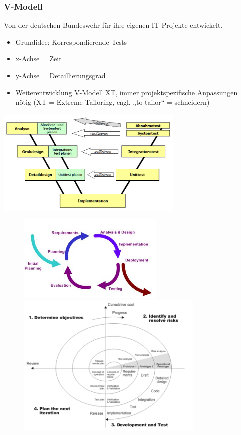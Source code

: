 \subsubsection{V-Modell}
Von der deutschen Bundeswehr für ihre eigenen IT-Projekte entwickelt.\\
\begin{minipage}{8cm}
	\begin{itemize}
		\item Grundidee: Korrespondierende Tests
		\item x-Achse = Zeit
		\item y-Achse = Detaillierungsgrad
		\item Weiterentwicklung V-Modell XT,\newline
        immer projektspezifische Anpassungen nötig\newline
        (XT = Extreme Tailoring, engl. „to tailor“ = schneidern)
	\end{itemize}
\end{minipage}
\begin{minipage}{9cm}
	\includegraphics[width=9cm]{images/vmodell}	
\end{minipage}
\hspace{-0.5cm}
\begin{figure}
	\includegraphics[width=7cm]{images/iterative_entwicklung.png}
	\includegraphics[width=9cm]{images/spiral_modell.png}
\end{figure}

